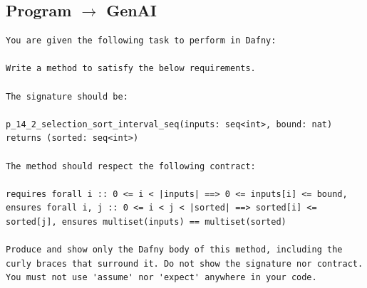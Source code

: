 \documentclass{article}
\begin{document}
\subsection*{Program $\rightarrow$ GenAI}
\begin{lstlisting}
You are given the following task to perform in Dafny:

Write a method to satisfy the below requirements.

The signature should be:

p_14_2_selection_sort_interval_seq(inputs: seq<int>, bound: nat) returns (sorted: seq<int>)

The method should respect the following contract:

requires forall i :: 0 <= i < |inputs| ==> 0 <= inputs[i] <= bound, ensures forall i, j :: 0 <= i < j < |sorted| ==> sorted[i] <= sorted[j], ensures multiset(inputs) == multiset(sorted)

Produce and show only the Dafny body of this method, including the curly braces that surround it. Do not show the signature nor contract. You must not use 'assume' nor 'expect' anywhere in your code.
\end{lstlisting}
\end{document}
